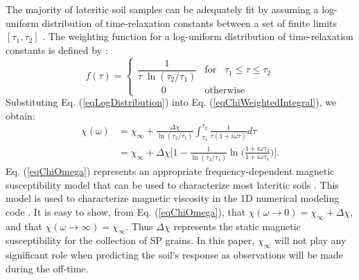 \documentclass[journal]{IEEEtran}  %
\begin{document}
The majority of lateritic soil samples can be
adequately fit by assuming a log-uniform distribution of
time-relaxation constants between a set of finite limits $[\tau_1,
\tau_2]$ \cite{Dabas1992,Mullins1973,Worm1998,Igel2012}. The
weighting function for a log-uniform distribution of time-relaxation
constants is defined by
\cite{Dabas1992,Mullins1973,Billings2003,Das2006}:
\begin{equation}
\label{eqLogDistribution}
f({\tau}) =
\begin{cases}
\dfrac{1}{\tau \; \ln(\tau_2/\tau_1)} & \textrm{for} \; \; \; \tau_1 \leq \tau \leq \tau_2 \\
\; \; \; \; \; \; \; \; \; 0 & \textrm{otherwise}
\end{cases}
\end{equation}
Substituting Eq. (\ref{eqLogDistribution}) into Eq. (\ref{eqChiWeightedIntegral}), we obtain:
\begin{equation}
\begin{split}
\chi (\omega) & = \chi_\infty + \frac{\Delta \chi}{\ln (\tau_2 /\tau_1)} \int_{\tau_1}^{\tau_2} \frac{1}{\tau (1 + i\omega \tau)} d\tau  \\
&= \chi_\infty + \Delta \chi \Bigg [ 1 - \frac{1}{\ln
(\tau_2/\tau_1)} \ln \Bigg ( \frac{1 + i\omega\tau_2}{1 +
i\omega\tau_1} \Bigg ) \Bigg ].
\end{split}
 \label{eqChiOmega}
\end{equation}
Eq. (\ref{eqChiOmega}) represents an appropriate frequency-dependent
magnetic susceptibility model that can be used to characterize most
lateritic soils
\cite{Mullins1973,Lee1984,Worm1998,Dabas1992,Pasion2007}.
This model is used to characterize magnetic
viscosity in the 1D numerical modeling code \cite{EM1DTM}. It is easy to show,
from Eq. (\ref{eqChiOmega}), that $\chi (\omega \rightarrow 0) =
\chi_\infty + \Delta \chi$, and that $\chi (\omega\rightarrow
\infty) = \chi_\infty$. Thus $\Delta \chi$
represents the static magnetic susceptibility for the collection of
SP grains. In this paper, $\chi_\infty$ will not play any
significant role when predicting the soil's response as observations
will be made during the off-time.
\end{document}
